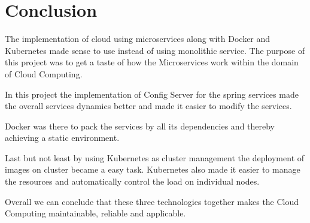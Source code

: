 \chapter{Conclusion}\label{ch:conclusion}

The implementation of cloud using microservices along with Docker and Kubernetes made sense to use instead of using monolithic service. The purpose of this project was to get a taste of how the Microservices work within the domain of Cloud Computing. 

In this project the implementation of Config Server for the spring services made the overall services dynamics better and made it easier to modify the services. 

Docker was there to pack the services by all its dependencies and thereby achieving a static environment. 

Last but not least by using Kubernetes as cluster management the deployment of images on cluster became a easy task. Kubernetes also made it easier to manage the resources and automatically control the load on individual nodes. 

Overall we can conclude that these three technologies together makes the Cloud Computing maintainable, reliable and applicable.


